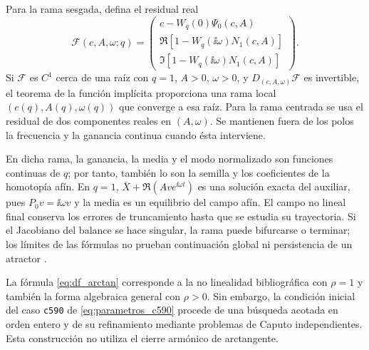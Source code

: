 Para la rama sesgada, defina el residual real
\begin{equation}
 \mathcal F(c,A,\omega;q)=
 \begin{pmatrix}
 c-W_q(0)\Psi_0(c,A)\\
 \Re[1-W_q(\ii\omega)N_1(c,A)]\\
 \Im[1-W_q(\ii\omega)N_1(c,A)]
 \end{pmatrix}.
 \label{eq:balance-branch-implicit-residual}
\end{equation}
Si \(\mathcal F\) es \(C^1\) cerca de una raíz con \(q=1\),
\(A>0\), \(\omega>0\), y
\(D_{(c,A,\omega)}\mathcal F\) es invertible, el teorema de la función
implícita proporciona una rama local
\((c(q),A(q),\omega(q))\) que converge a esa raíz. Para la rama
centrada se usa el residual de dos componentes reales en \((A,\omega)\).
Se mantienen fuera de los polos la frecuencia y la ganancia continua
cuando ésta interviene.

En dicha rama, la ganancia, la media y el modo normalizado son funciones
continuas de \(q\); por tanto, también lo son la semilla y los
coeficientes de la homotopía afín. En \(q=1\),
\(\bar X+\Re(Ave^{\ii\omega t})\) es una solución exacta del
auxiliar, pues \(P_0v=\ii\omega v\) y la media es un equilibrio
del campo afín. El campo no lineal final conserva los errores de
truncamiento hasta que se estudia su trayectoria. Si el Jacobiano del
balance se hace singular, la rama puede bifurcarse o terminar; los
límites de las fórmulas no prueban continuación global ni persistencia
de un atractor \cite{LeonovKuznetsov2013,KuznetsovEtAl2017}.

La fórmula \cref{eq:df_arctan} corresponde a la no linealidad bibliográfica con
\(\rho=1\) y también la forma algebraica general con \(\rho>0\). Sin embargo,
la condición inicial del caso \texttt{c590} de
\cref{eq:parametros_c590} procede de una búsqueda acotada en orden entero y
de su refinamiento mediante problemas de Caputo independientes. Esta
construcción no utiliza el cierre armónico de arctangente.
